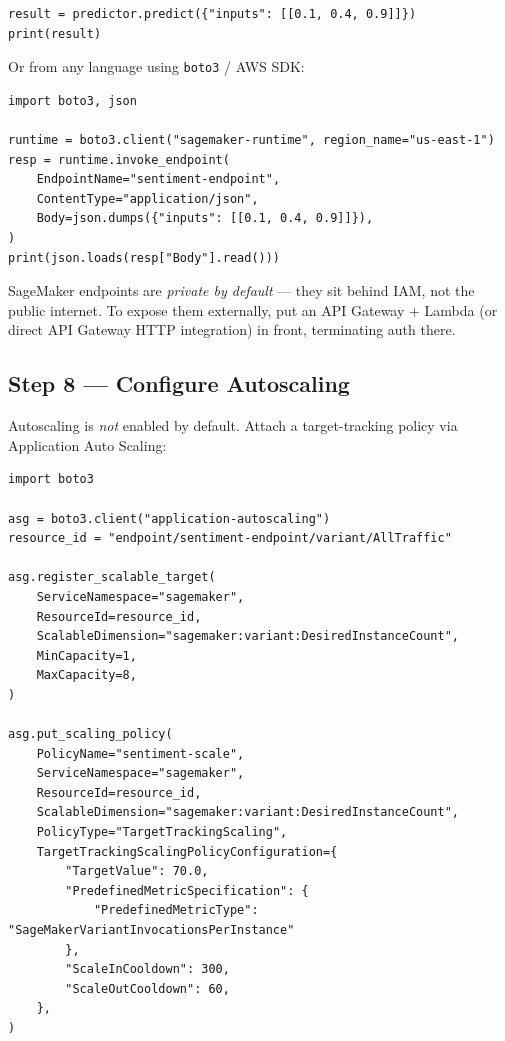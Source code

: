 \documentclass[11pt,a4paper]{article}
\begin{document}
\begin{lstlisting}[style=pycode]
result = predictor.predict({"inputs": [[0.1, 0.4, 0.9]]})
print(result)
\end{lstlisting}

Or from any language using \texttt{boto3} / AWS SDK:

\begin{lstlisting}[style=pycode]
import boto3, json

runtime = boto3.client("sagemaker-runtime", region_name="us-east-1")
resp = runtime.invoke_endpoint(
    EndpointName="sentiment-endpoint",
    ContentType="application/json",
    Body=json.dumps({"inputs": [[0.1, 0.4, 0.9]]}),
)
print(json.loads(resp["Body"].read()))
\end{lstlisting}

\begin{notebox}
SageMaker endpoints are \emph{private by default} --- they sit behind IAM, not
the public internet. To expose them externally, put an API Gateway + Lambda (or
direct API Gateway HTTP integration) in front, terminating auth there.
\end{notebox}

\subsection{Step 8 --- Configure Autoscaling}

Autoscaling is \emph{not} enabled by default. Attach a target-tracking policy
via Application Auto Scaling:

\begin{lstlisting}[style=pycode]
import boto3

asg = boto3.client("application-autoscaling")
resource_id = "endpoint/sentiment-endpoint/variant/AllTraffic"

asg.register_scalable_target(
    ServiceNamespace="sagemaker",
    ResourceId=resource_id,
    ScalableDimension="sagemaker:variant:DesiredInstanceCount",
    MinCapacity=1,
    MaxCapacity=8,
)

asg.put_scaling_policy(
    PolicyName="sentiment-scale",
    ServiceNamespace="sagemaker",
    ResourceId=resource_id,
    ScalableDimension="sagemaker:variant:DesiredInstanceCount",
    PolicyType="TargetTrackingScaling",
    TargetTrackingScalingPolicyConfiguration={
        "TargetValue": 70.0,
        "PredefinedMetricSpecification": {
            "PredefinedMetricType": "SageMakerVariantInvocationsPerInstance"
        },
        "ScaleInCooldown": 300,
        "ScaleOutCooldown": 60,
    },
)
\end{lstlisting}
\end{document}

